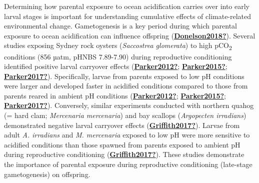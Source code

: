 \documentclass [11pt, proquest] {uwthesis}[2015/03/03]
\begin{document}
Determining how parental exposure to ocean acidification carries over into early larval stages is important for understanding cumulative effects of climate-related environmental change. Gametogenesis is a key period during which parental exposure to ocean acidification can influence offspring (\protect\hyperlink{ref-Donelson2018}{\textbf{Donelson2018?}}). Several studies exposing Sydney rock oysters (\emph{Saccostrea glomerata}) to high pCO\textsubscript{2} conditions (856 µatm, pHNBS 7.89-7.90) during reproductive conditioning identified positive larval carryover effects (\protect\hyperlink{ref-Parker2012}{\textbf{Parker2012?}}; \protect\hyperlink{ref-Parker2015}{\textbf{Parker2015?}}; \protect\hyperlink{ref-Parker2017}{\textbf{Parker2017?}}). Specifically, larvae from parents exposed to low pH conditions were larger and developed faster in acidified conditions compared to those from parents reared in ambient pH conditions (\protect\hyperlink{ref-Parker2012}{\textbf{Parker2012?}}; \protect\hyperlink{ref-Parker2015}{\textbf{Parker2015?}}; \protect\hyperlink{ref-Parker2017}{\textbf{Parker2017?}}). Conversely, similar experiments conducted with northern quahog (= hard clam; \emph{Mercenaria mercenaria}) and bay scallops (\emph{Argopecten irradians}) demonstrated negative larval carryover effects (\protect\hyperlink{ref-Griffith2017}{\textbf{Griffith2017?}}). Larvae from adult \emph{A. irradians} and \emph{M. mercenaria} exposed to low pH were more sensitive to acidified conditions than those spawned from parents exposed to ambient pH during reproductive conditioning (\protect\hyperlink{ref-Griffith2017}{\textbf{Griffith2017?}}). These studies demonstrate the importance of parental exposure during reproductive conditioning (late-stage gametogenesis) on offspring.
\end{document}
